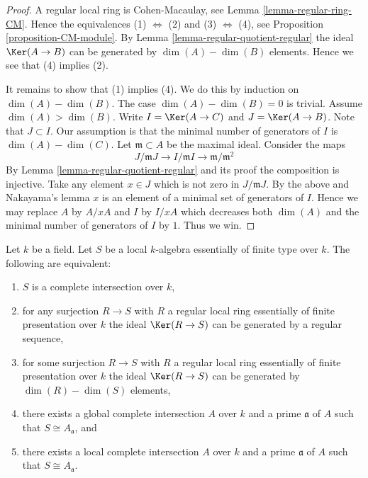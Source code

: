 \begin{proof}
A regular local ring is Cohen-Macaulay, see Lemma \ref{lemma-regular-ring-CM}.
Hence the equivalences (1) $\Leftrightarrow$ (2) and
(3) $\Leftrightarrow$ (4), see Proposition \ref{proposition-CM-module}.
By Lemma \ref{lemma-regular-quotient-regular}
the ideal $\Ker(A \to B)$ can be generated
by $\dim(A) - \dim(B)$ elements.
Hence we see that (4) implies (2).

\medskip\noindent
It remains to show that (1) implies (4). We do this by induction on
$\dim(A) - \dim(B)$. The case $\dim(A) - \dim(B) = 0$ is trivial.
Assume $\dim(A) > \dim (B)$.
Write $I = \Ker(A \to C)$ and $J = \Ker(A \to B)$.
Note that $J \subset I$. Our assumption is that the minimal number
of generators of $I$ is $\dim(A) - \dim(C)$.
Let $\mathfrak m \subset A$ be the maximal
ideal. Consider the maps
$$
J/ \mathfrak m J \to  I / \mathfrak m I \to \mathfrak m /\mathfrak m^2
$$
By Lemma \ref{lemma-regular-quotient-regular} and its proof the
composition is injective. Take any element $x \in J$ which is
not zero in $J /\mathfrak mJ$. By the above and Nakayama's lemma
$x$ is an element of a minimal set of generators of $I$.
Hence we may replace $A$ by $A/xA$ and $I$ by $I/xA$ which
decreases both $\dim(A)$ and the minimal number of generators of $I$
by $1$. Thus we win.
\end{proof}

\begin{lemma}
\label{lemma-lci-local}
Let $k$ be a field. Let $S$ be a local $k$-algebra essentially of finite
type over $k$. The following are equivalent:
\begin{enumerate}
\item $S$ is a complete intersection over $k$,
\item for any surjection $R \to S$ with $R$ a regular local ring
essentially of finite presentation over $k$ the ideal
$\Ker(R \to S)$ can be generated by a regular sequence,
\item for some surjection $R \to S$ with $R$ a regular local ring
essentially of finite presentation over $k$ the ideal
$\Ker(R \to S)$ can be generated by
$\dim(R) - \dim(S)$ elements,
\item there exists a global complete intersection
$A$ over $k$ and a prime $\mathfrak a$ of $A$ such
that $S \cong A_{\mathfrak a}$, and
\item there exists a local complete intersection
$A$ over $k$ and a prime $\mathfrak a$ of $A$ such
that $S \cong A_{\mathfrak a}$.
\end{enumerate}
\end{lemma}

